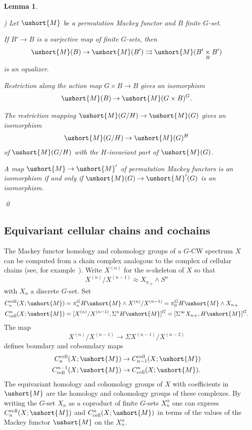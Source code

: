 \documentclass{amsart}
\newtheorem{lem}[equation]{Lemma}
\theoremstyle{definition}
\theoremstyle{remark}
\newcounter{thmItem}
\newenvironment{thmList}{\begin{list}%
{\rm \roman{thmItem})}{\usecounter{thmItem}
\setlength{\labelwidth}{2em}
\setlength{\itemindent}{2em}
\setlength{\leftmargin}{0pt}
\setlength{\listparindent}{0pt}
\setlength{\parsep}{0pt}
\setlength{\partopsep}{0pt}
\setlength{\itemsep}{\medskipamount}
\setlength{\topsep}{\medskipamount}
}}{\end{list}}
\newcommand{\Mm}{\ushort{M}}
\begin{document}
\begin{lem}
\label{thm:109}
\begin{thmList}
Let $\Mm$ be a permutation Mackey functor and $B$ finite $G$-set.
\item\label{part:4} 
If $B'\to B$ is a surjective map of finite
$G$-sets, then 
\[
\Mm(B)\to \Mm(B') \rightrightarrows \Mm(B'\underset{B}{\times}B')
\]
is an equalizer.
\item\label{part:3} Restriction along the action map
$G\times B\to B$ gives an isomorphism
\[
\Mm(B)\to \Mm(G\times B)^{G}.
\]
\item\label{part:1} The restriction mapping $\Mm(G/H)\to \Mm(G)$ gives an
isomorphism
\[
\Mm(G/H) \to \Mm(G)^{H}
\]
of $\Mm(G/H)$ with the $H$-invariant part of $\Mm(G)$.   
\item \label{part:2}  A map $\Mm\to \Mm'$ of
permutation Mackey functors is an isomorphism if and only if $\Mm(G)\to
\Mm'(G)$ is an isomorphism. 
\end{thmList}\qed
\end{lem}

\subsection{Equivariant cellular chains and cochains}
\label{sec:mack-funct-cohom}

The Mackey functor homology and cohomology groups of a $G$-CW spectrum
$X$ can be computed from a chain complex analogous to the complex of
cellular chains (see, for example~\cite[\S5]{MR1361893}).  Write
$X^{(n)}$ for the $n$-skeleton of $X$ so that
\[
X^{(n)}/X^{(n-1)}\approx {X_{n}}_{+}\wedge S^{n}
\]
with ${X_{n}}$ a discrete $G$-set.  Set
\begin{align*}
C_{n}^{\text{cell}}(X;\Mm) &= \pi^{G}_{n}H\Mm\wedge X^{(n)}/X^{(n-1)} = \pi^{G}_{0}H\Mm\wedge {X_{n}}_{+} \\
C^{n}_{\text{cell}}(X;\Mm) &= [X^{(n)}/X^{(n-1)},\Sigma^{n}H\Mm]^{G} =
[\Sigma^{\infty}{X_{n}}_{+},H\Mm]^{G}.
\end{align*}
The map
\[
X^{(n)}/X^{(n-1)}\to \Sigma X^{(n-1)}/X^{(n-2)}
\]
defines boundary and coboundary maps
\begin{align*}
C_{n}^{\text{cell}}(X;\Mm) &\to C_{n-1}^{\text{cell}}(X;\Mm) \\
C^{n-1}_{\text{cell}}(X;\Mm) &\to C^{n}_{\text{cell}}(X;\Mm).
\end{align*}
The equivariant homology and cohomology groups of $X$ with
coefficients in $\Mm$ are the homology and cohomology groups of these
complexes.  By writing the $G$-set ${X_{n}}$ as a coproduct of finite
$G$-sets $X_{n}^{\alpha}$ one can express $C_{n}^{\text{cell}}(X;\Mm)$
and $C^{n}_{\text{cell}}(X;\Mm)$ in terms of the values of the Mackey
functor $\Mm$ on the $X_{n}^{\alpha}$.
\end{document}
